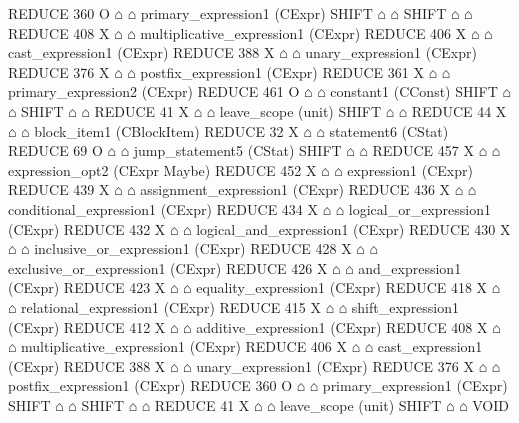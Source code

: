 \begin{isabellebody}
\begin{isamarkuptext}
\begin{isar}
                                   REDUCE 360 O $\house$ $\house$ primary_expression1  (CExpr) 
                                    SHIFT $\house$ $\house$ 
                              SHIFT $\house$ $\house$ 
                              REDUCE 408 X $\house$ $\house$ multiplicative_expression1  (CExpr) 
                               REDUCE 406 X $\house$ $\house$ cast_expression1  (CExpr) 
                                REDUCE 388 X $\house$ $\house$ unary_expression1  (CExpr) 
                                 REDUCE 376 X $\house$ $\house$ postfix_expression1  (CExpr) 
                                  REDUCE 361 X $\house$ $\house$ primary_expression2  (CExpr) 
                                   REDUCE 461 O $\house$ $\house$ constant1  (CConst) 
                                    SHIFT $\house$ $\house$ 
                 SHIFT $\house$ $\house$ 
             REDUCE 41 X $\house$ $\house$ leave_scope  (unit) 
             SHIFT $\house$ $\house$ 
       REDUCE 44 X $\house$ $\house$ block_item1  (CBlockItem) 
        REDUCE 32 X $\house$ $\house$ statement6  (CStat) 
         REDUCE 69 O $\house$ $\house$ jump_statement5  (CStat) 
          SHIFT $\house$ $\house$ 
          REDUCE 457 X $\house$ $\house$ expression_opt2  (CExpr Maybe) 
           REDUCE 452 X $\house$ $\house$ expression1  (CExpr) 
            REDUCE 439 X $\house$ $\house$ assignment_expression1  (CExpr) 
             REDUCE 436 X $\house$ $\house$ conditional_expression1  (CExpr) 
              REDUCE 434 X $\house$ $\house$ logical_or_expression1  (CExpr) 
               REDUCE 432 X $\house$ $\house$ logical_and_expression1  (CExpr) 
                REDUCE 430 X $\house$ $\house$ inclusive_or_expression1  (CExpr) 
                 REDUCE 428 X $\house$ $\house$ exclusive_or_expression1  (CExpr) 
                  REDUCE 426 X $\house$ $\house$ and_expression1  (CExpr) 
                   REDUCE 423 X $\house$ $\house$ equality_expression1  (CExpr) 
                    REDUCE 418 X $\house$ $\house$ relational_expression1  (CExpr) 
                     REDUCE 415 X $\house$ $\house$ shift_expression1  (CExpr) 
                      REDUCE 412 X $\house$ $\house$ additive_expression1  (CExpr) 
                       REDUCE 408 X $\house$ $\house$ multiplicative_expression1  (CExpr) 
                        REDUCE 406 X $\house$ $\house$ cast_expression1  (CExpr) 
                         REDUCE 388 X $\house$ $\house$ unary_expression1  (CExpr) 
                          REDUCE 376 X $\house$ $\house$ postfix_expression1  (CExpr) 
                           REDUCE 360 O $\house$ $\house$ primary_expression1  (CExpr) 
                            SHIFT $\house$ $\house$ 
          SHIFT $\house$ $\house$ 
      REDUCE 41 X $\house$ $\house$ leave_scope  (unit) 
      SHIFT $\house$ $\house$ 
VOID  
\end{isar}%
\end{isamarkuptext}\isamarkuptrue%
%
\isadelimtheory
%
\endisadelimtheory
%
\isatagtheory
%
\endisatagtheory
{\isafoldtheory}%
%
\isadelimtheory
%
\endisadelimtheory
%
\end{isabellebody}%
